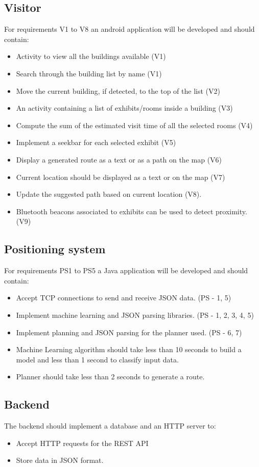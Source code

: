 \subsection{Visitor}
For requirements V1 to V8 an android application will be developed and should contain:
	\begin{itemize}
		\item Activity to view all the buildings available (V1)
		\item Search through the building list by name (V1)
		\item Move the current building, if detected, to the top of the list (V2)
		\item An activity containing a list of exhibits/rooms inside a building (V3)
		\item Compute the sum of the estimated visit time of all the selected rooms (V4)
		\item Implement a seekbar for each selected exhibit (V5)
		\item Display a generated route as a text or as a path on the map (V6)
		\item Current location should be displayed as a text or on the map (V7)
		\item Update the suggested path based on current location (V8).
		\item Bluetooth beacons associated to exhibits can be used to detect proximity. (V9)
	\end{itemize}

\subsection{Positioning system}
For requirements PS1 to PS5 a Java application will be developed and should contain:
	\begin{itemize}
		\item Accept TCP connections to send and receive JSON data. (PS - 1, 5)
		\item Implement machine learning and JSON parsing libraries. (PS - 1, 2, 3, 4, 5)
		\item Implement planning and JSON parsing for the planner used. (PS - 6, 7)
		\item Machine Learning algorithm should take less than 10 seconds to build a model and less than 1 second to classify input data.
		\item Planner should take less than 2 seconds to generate a route.
	\end{itemize}

\subsection{Backend}
The backend should implement a database and an HTTP server to:
	\begin{itemize}
		\item Accept HTTP requests for the REST API
		\item Store data in JSON format.
	\end{itemize}


